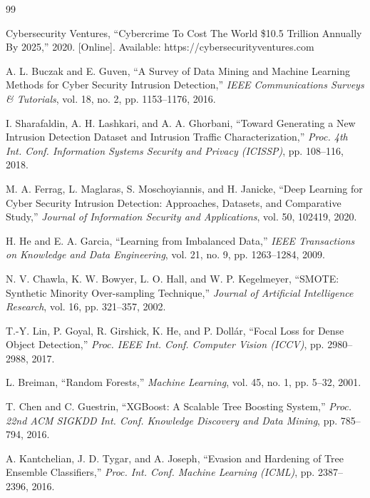 \documentclass[10pt,twocolumn]{article}
\begin{document}
\begin{thebibliography}{99}

Cybersecurity Ventures, ``Cybercrime To Cost The World \$10.5 Trillion Annually By 2025,'' 2020. [Online]. Available: https://cybersecurityventures.com

A. L. Buczak and E. Guven, ``A Survey of Data Mining and Machine Learning Methods for Cyber Security Intrusion Detection,'' \textit{IEEE Communications Surveys \& Tutorials}, vol. 18, no. 2, pp. 1153--1176, 2016.

I. Sharafaldin, A. H. Lashkari, and A. A. Ghorbani, ``Toward Generating a New Intrusion Detection Dataset and Intrusion Traffic Characterization,'' \textit{Proc. 4th Int. Conf. Information Systems Security and Privacy (ICISSP)}, pp. 108--116, 2018.

M. A. Ferrag, L. Maglaras, S. Moschoyiannis, and H. Janicke, ``Deep Learning for Cyber Security Intrusion Detection: Approaches, Datasets, and Comparative Study,'' \textit{Journal of Information Security and Applications}, vol. 50, 102419, 2020.

H. He and E. A. Garcia, ``Learning from Imbalanced Data,'' \textit{IEEE Transactions on Knowledge and Data Engineering}, vol. 21, no. 9, pp. 1263--1284, 2009.

N. V. Chawla, K. W. Bowyer, L. O. Hall, and W. P. Kegelmeyer, ``SMOTE: Synthetic Minority Over-sampling Technique,'' \textit{Journal of Artificial Intelligence Research}, vol. 16, pp. 321--357, 2002.

T.-Y. Lin, P. Goyal, R. Girshick, K. He, and P. Dollár, ``Focal Loss for Dense Object Detection,'' \textit{Proc. IEEE Int. Conf. Computer Vision (ICCV)}, pp. 2980--2988, 2017.

L. Breiman, ``Random Forests,'' \textit{Machine Learning}, vol. 45, no. 1, pp. 5--32, 2001.

T. Chen and C. Guestrin, ``XGBoost: A Scalable Tree Boosting System,'' \textit{Proc. 22nd ACM SIGKDD Int. Conf. Knowledge Discovery and Data Mining}, pp. 785--794, 2016.

A. Kantchelian, J. D. Tygar, and A. Joseph, ``Evasion and Hardening of Tree Ensemble Classifiers,'' \textit{Proc. Int. Conf. Machine Learning (ICML)}, pp. 2387--2396, 2016.

\end{thebibliography}
\end{document}
